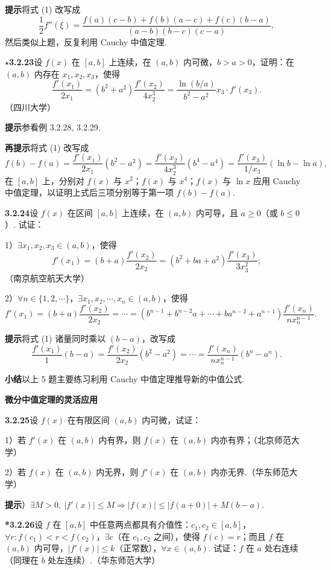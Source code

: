 \documentclass[UTF8, 12pt, fontset=fandol, oneside]{ctexart}
\begin{document}
\noindent\textbf{提示}\quad 将式 (1) 改写成
\[
  \frac12f''(\xi)=
  \frac{f(a)(c-b)+f(b)(a-c)+f(c)(b-a)}
  {(a-b)(b-c)(c-a)},
\]
然后类似上题，反复利用 Cauchy 中值定理.

\noindent\textbf{$\star$3.2.23}\quad 设 $f(x)$ 在 $[a,b]$ 上连续，在 $(a,b)$ 内可微，$b>a>0$，证明：在 $(a,b)$ 内存在 $x_1,x_2,x_3$，使得
\[
  \frac{f'(x_1)}{2x_1}
  =(b^2+a^2)\frac{f'(x_2)}{4x_2^3}
  =\frac{\ln(b/a)}{b^2-a^2}x_3\cdot f'(x_3).
\tag{1}
\]
（四川大学）

\noindent\textbf{提示}\quad 参看例 3.2.28, 3.2.29.

\noindent\textbf{再提示}\quad 将式 (1) 改写成
\[
  f(b)-f(a)
  =
  \frac{f'(x_1)}{2x_1}(b^2-a^2)
  =
  \frac{f'(x_2)}{4x_2^3}(b^4-a^4)
  =
  \frac{f'(x_3)}{1/x_3}(\ln b-\ln a),
\]
在 $[a,b]$ 上，分别对 $f(x)$ 与 $x^2$；$f(x)$ 与 $x^4$；$f(x)$ 与 $\ln x$ 应用 Cauchy 中值定理，以证明上式后三项分别等于第一项 $f(b)-f(a)$.

\noindent\textbf{3.2.24}\quad 设 $f(x)$ 在区间 $[a,b]$ 上连续，在 $(a,b)$ 内可导，且 $a\ge0$（或 $b\le0$）. 试证：

1）$\exists x_1,x_2,x_3\in(a,b)$，使得
\[
  f'(x_1)=(b+a)\frac{f'(x_2)}{2x_2}
  =(b^2+ba+a^2)\frac{f'(x_3)}{3x_3^2};
\]
（南京航空航天大学）

2）$\forall n\in\{1,2,\cdots\}$，$\exists x_1,x_2,\cdots,x_n\in(a,b)$，使得
\[
  f'(x_1)=(b+a)\frac{f'(x_2)}{2x_2}
  =\cdots
  =(b^{n-1}+b^{n-2}a+\cdots+ba^{n-2}+a^{n-1})\frac{f'(x_n)}{nx_n^{n-1}}.
\tag{1}
\]

\noindent\textbf{提示}\quad 将式 (1) 诸量同时乘以 $(b-a)$，改写成
\[
  \frac{f'(x_1)}1(b-a)
  =\frac{f'(x_2)}{2x_2}(b^2-a^2)
  =\cdots
  =\frac{f'(x_n)}{nx_n^{n-1}}(b^n-a^n).
\]

\noindent\textbf{小结}\quad 以上 5 题主要练习利用 Cauchy 中值定理推导新的中值公式.

\noindent\textbf{微分中值定理的灵活应用}

\noindent\textbf{3.2.25}\quad 设 $f(x)$ 在有限区间 $(a,b)$ 内可微，试证：

1）若 $f'(x)$ 在 $(a,b)$ 内有界，则 $f(x)$ 在 $(a,b)$ 内亦有界；（北京师范大学）

2）若 $f(x)$ 在 $(a,b)$ 内无界，则 $f'(x)$ 在 $(a,b)$ 内亦无界.（华东师范大学）

\noindent\textbf{提示}）$\exists M>0,\ |f'(x)|\le M\Rightarrow |f(x)|\le |f(a+0)|+M(b-a)$.

\noindent\textbf{*3.2.26}\quad 设 $f$ 在 $[a,b]$ 中任意两点都具有介值性：$c_1,c_2\in[a,b]$，$\forall r:f(c_1)<r<f(c_2)$，$\exists c$（在 $c_1,c_2$ 之间），使得 $f(c)=r$；而且 $f$ 在 $(a,b)$ 内可导，$|f'(x)|\le k$（正常数），$\forall x\in(a,b)$. 试证：$f$ 在 $a$ 处右连续（同理在 $b$ 处左连续）.（华东师范大学）
\end{document}
